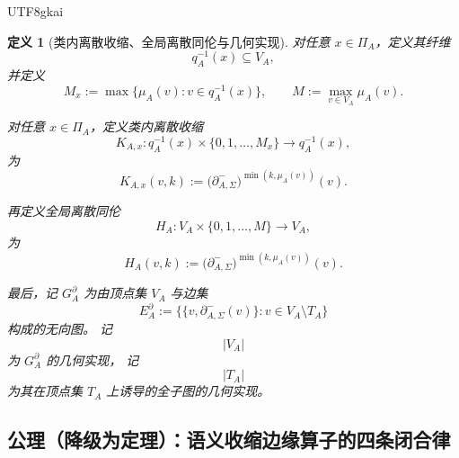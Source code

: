 \documentclass[12pt]{article}
\newtheorem{definition}{定义}[section]
\begin{document}
\begin{CJK*}{UTF8}{gkai}
\begin{definition}[类内离散收缩、全局离散同伦与几何实现]
\label{def:tex1-ch9-contraction}
对任意 \(x\in \Pi_A\)，定义其纤维
\[
  q_A^{-1}(x)\subseteq V_A,
\]
并定义
\[
  M_x:=\max\{\mu_A(v):v\in q_A^{-1}(x)\},
  \qquad
  M:=\max_{v\in V_A}\mu_A(v).
\]

对任意 \(x\in \Pi_A\)，定义类内离散收缩
\[
  K_{A,x}:q_A^{-1}(x)\times \{0,1,\dots,M_x\}\to q_A^{-1}(x),
\]
为
\[
  K_{A,x}(v,k)
  :=
  \bigl(\partial^-_{A,\Sigma}\bigr)^{\min(k,\mu_A(v))}(v).
\]

再定义全局离散同伦
\[
  H_A:V_A\times \{0,1,\dots,M\}\to V_A,
\]
为
\[
  H_A(v,k)
  :=
  \bigl(\partial^-_{A,\Sigma}\bigr)^{\min(k,\mu_A(v))}(v).
\]

最后，记 \(G_A^\partial\) 为由顶点集 \(V_A\) 与边集
\[
  E_A^\partial
  :=
  \bigl\{
    \{v,\partial^-_{A,\Sigma}(v)\}
    :
    v\in V_A\setminus T_A
  \bigr\}
\]
构成的无向图。
记
\[
  |V_A|
\]
为 \(G_A^\partial\) 的几何实现，
记
\[
  |T_A|
\]
为其在顶点集 \(T_A\) 上诱导的全子图的几何实现。
\end{definition}

\subsection{公理（降级为定理）：语义收缩边缘算子的四条闭合律}
\label{subsec:tex1-ch9-axiom}


\end{CJK*}
\end{document}
